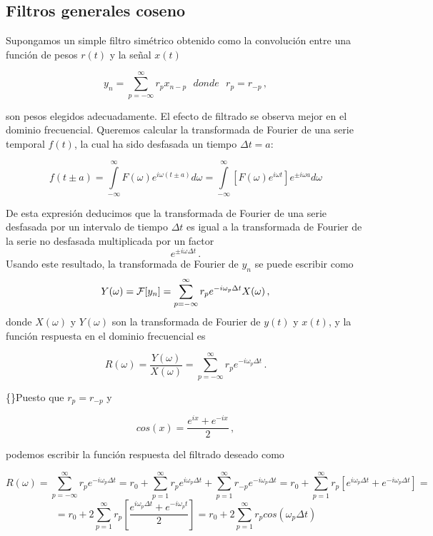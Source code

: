 \documentclass[
]{agujournal2019}
\begin{document}
\subsection{Filtros generales coseno}\label{filtros-generales-coseno}

Supongamos un simple filtro simétrico obtenido como la convolución entre
una función de pesos \(r(t)\) y la señal \(x(t)\)

\[y_n=\sum\limits^{\infty}_{p=-\infty} r_p x_{n-p}\,\,\,\,{ donde}\,\,\,\,r_p=r_{-p}\,,\]

son pesos elegidos adecuadamente. El efecto de filtrado se observa mejor
en el dominio frecuencial. Queremos calcular la transformada de Fourier
de una serie temporal \(f(t)\), la cual ha sido desfasada un tiempo
\(\Delta t = a\):

\[f(t\pm a)=\int\limits^{\infty}_{-\infty} F(\omega)e^{i\omega (t\pm a)} d{\omega}=
\int\limits^{\infty}_{-\infty}  \left[F(\omega) e^{i \omega t}\right]e^{\pm i \omega a} d{\omega}\]

De esta expresión deducimos que la transformada de Fourier de una serie
desfasada por un intervalo de tiempo \(\Delta t\) es igual a la
transformada de Fourier de la serie no desfasada multiplicada por un
factor \[e^{\pm i\omega \Delta t}\,.\] Usando este resultado, la
transformada de Fourier de \(y_n\) se puede escribir como
\[Y(\omega)={\cal F}[y_n]=\sum\limits^{\infty}_{p=-\infty} r_p e^{-i\omega_p \Delta t} X(\omega)\,,\]
donde \(X(\omega)\) y \(Y(\omega)\) son la transformada de Fourier de
\(y(t)\) y \(x(t)\), y la función respuesta en el dominio frecuencial es

\[R(\omega)=\frac{Y(\omega)}{X(\omega)}=\sum\limits^{\infty}_{p=-\infty} r_p e^{-i\omega_p \Delta t}\,.\]

\{\noindent\}Puesto que \(r_p=r_{-p}\) y

\[{ cos}(x)=\frac{e^{ix} + e^{-ix}}{2}\,,\]

podemos escribir la función respuesta del filtrado deseado como

\[R(\omega)=\sum\limits^{\infty}_{p=-\infty} r_p e^{-i\omega_p \Delta t}=
r_0 + \sum\limits^{\infty}_{p=1} r_p e^{i\omega_p \Delta t}
+ \sum\limits^{\infty}_{p=1} r_{-p} e^{-i\omega_p \Delta t} =
r_0 + \sum\limits^{\infty}_{p=1} r_p \left[ e^{i\omega_p \Delta t} + e^{-i\omega_p \Delta t}\right]=
\]
\[=r_0 + 2\sum\limits^{\infty}_{p=1} r_p \left[ \frac{e^{i\omega_p \Delta t} + e^{-i\omega_p t}}{2}\right]=
r_0 + 2\sum\limits^{\infty}_{p=1}r_p cos(\omega_p \Delta t)\]
\end{document}
